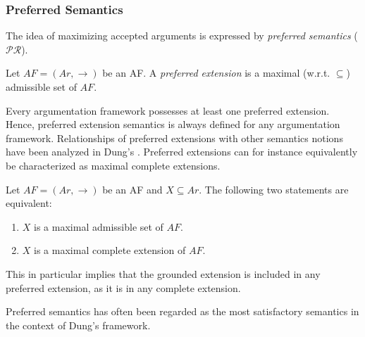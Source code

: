 \subsubsection{Preferred Semantics}


The idea of maximizing accepted arguments is expressed by \textit{preferred semantics} ($\mathcal{PR}$).


\begin{df}
    Let $AF=(Ar,\to)$ be an AF. 
    A  \textit{preferred extension} is a maximal (w.r.t. $\subseteq$) admissible set of $AF$. 
\end{df}



Every argumentation framework possesses at least one preferred extension.
Hence, 
preferred extension semantics is always defined for any argumentation framework. 
% 
Relationships of preferred extensions with other semantics notions have been analyzed in Dung's \cite{Dun1995}. 
%
Preferred extensions can for instance equivalently be characterized as maximal complete extensions.


\begin{prop}
    Let $AF=(Ar,\to)$ be an AF and $X \subseteq Ar$. 
    The following two statements are equivalent:
    \begin{enumerate}[itemsep=5pt,parsep=5pt,leftmargin=3em,topsep=5pt,label=(\arabic*)] 
        \item $X$ is a maximal admissible set of $AF$.
        
        \item $X$ is a maximal complete extension of $AF$.
    \end{enumerate}
\end{prop}


This in particular implies that the grounded extension is included in any preferred extension, 
as it is in any complete extension.


Preferred semantics has often been regarded as the most satisfactory semantics in the context of Dung's framework.



